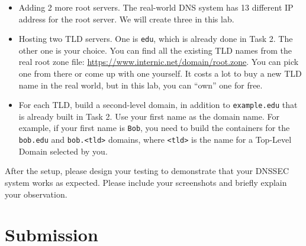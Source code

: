\begin{itemize}
\item Adding 2 more root servers. The real-world DNS system has 13 different
IP address for the root server. We will create three in this lab.

\item Hosting two TLD servers. One is \texttt{edu}, which is already
done in Task 2. The other one is your choice.
You can find all the existing TLD names from the
real root zone file: \url{https://www.internic.net/domain/root.zone}.
You can pick one from there or come up with one yourself.
It costs a lot to buy a new TLD name in the real world, but in this lab, you
can ``own'' one for free.

\item For each TLD, build a second-level domain, in
addition to \texttt{example.edu} that is already built in Task 2.
Use your first name as the domain name.
For example, if your first name is \texttt{Bob}, you need to build the containers
for the \texttt{bob.edu} and \texttt{bob.<tld>} domains,
where \texttt{<tld>} is the name for a Top-Level Domain selected
by you.
\end{itemize}


After the setup, please design your testing to demonstrate 
that your DNSSEC system works as expected. Please include your screenshots
and briefly explain your observation. 




\section{Submission}





